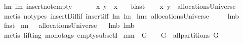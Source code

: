 \begin{isabellebody}
\isamarkupfalse%
\ lm{}{}\ lm{}{}\ insert{\isacharunderscore}not{\isacharunderscore}empty\ \isanewline
{}\isamarkupfalse%
\ {\isacharminus}\isanewline
\ \ \isamarkupfalse%
\ {\isachardoublequoteopen}{\isacharparenleft}x{\isacharcomma}\ {\isacharbraceleft}y{\isacharbraceright}{\isacharparenright}\ {\isasymnoteq}\ {\isacharparenleft}x{\isacharcomma}\ {\isacharbraceleft}{\isacharbraceright}{\isacharparenright}{\isachardoublequoteclose}\ \isamarkupfalse%
\ blast\isanewline
\ \ \isamarkupfalse%
\ {\isachardoublequoteopen}{\isacharbraceleft}{\isacharparenleft}x{\isacharcomma}\ {\isacharbraceleft}y{\isacharbraceright}{\isacharparenright}{\isacharbraceright}\ {\isasymin}\ allocationsUniverse{\isachardoublequoteclose}\ \isamarkupfalse%
\ {\isacharparenleft}metis\ {\isacharparenleft}no{\isacharunderscore}types{\isacharparenright}\ insert{\isacharunderscore}Diff{\isacharunderscore}if\ insert{\isacharunderscore}iff\ lm{}{}\ lm{}{}{\isacharparenright}\isanewline
{}\isamarkupfalse%
%
\endisatagproof
{\isafoldproof}%
%
\isadelimproof
%
\endisadelimproof
\isanewline
{}\isamarkupfalse%
\ lm{}{}c{\isacharcolon}\ {\isachardoublequoteopen}allocationsUniverse\ {\isasymnoteq}\ {\isacharbraceleft}{\isacharbraceright}{\isachardoublequoteclose}%
\isadelimproof
\ %
\endisadelimproof
%
\isatagproof
{}\isamarkupfalse%
\ lm{}{}b\ \isamarkupfalse%
\ fast%
\endisatagproof
{\isafoldproof}%
%
\isadelimproof
%
\endisadelimproof
\isanewline
{}\isamarkupfalse%
\ nn{}{}{\isacharcolon}\ {\isachardoublequoteopen}{\isacharbraceleft}{\isacharbraceright}\ {\isasymin}\ allocationsUniverse{\isachardoublequoteclose}%
\isadelimproof
\ %
\endisadelimproof
%
\isatagproof
{}\isamarkupfalse%
\ lm{}{}b\ lm{}{}b\ \isamarkupfalse%
\ {\isacharparenleft}metis\ {\isacharparenleft}lifting{\isacharcomma}\ mono{\isacharunderscore}tags{\isacharparenright}\ empty{\isacharunderscore}subsetI{\isacharparenright}%
\endisatagproof
{\isafoldproof}%
%
\isadelimproof
%
\endisadelimproof
\isanewline
{}\isamarkupfalse%
\ mm{}{}{\isacharcolon}\ \ {\isachardoublequoteopen}G\ {\isasymnoteq}\ {\isacharbraceleft}{\isacharbraceright}{\isachardoublequoteclose}\ \ {\isachardoublequoteopen}{\isacharbraceleft}G{\isacharbraceright}\ {\isasymin}\ all{\isacharunderscore}partitions\ G{\isachardoublequoteclose}%

\end{isabellebody}
